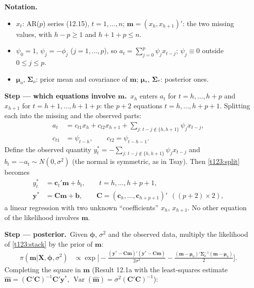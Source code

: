 \documentclass[11pt,a4paper]{article}
\newenvironment{notacao}{\par\smallskip\noindent\textbf{Notation.}\begin{itemize}[leftmargin=1.4em,topsep=1pt,itemsep=0pt]\small}{\end{itemize}}
\newcommand{\passo}[2]{\par\smallskip\noindent\textbf{Step --- #1.}~#2}
\begin{document}
\begin{sol}
\begin{notacao}
\item $x_t$: AR($p$) series (12.15), $t=1,\ldots,n$; $\boldsymbol m=(x_h,x_{h+1})'$: the two missing values, with $h-p\ge1$ and $h+1+p\le n$.
\item $\psi_0=1$, $\psi_j=-\phi_j$ ($j=1,\ldots,p$), so $a_t=\sum_{j=0}^p\psi_jx_{t-j}$; $\psi_j\equiv0$ outside $0\le j\le p$.
\item $\boldsymbol\mu_o$, $\boldsymbol\Sigma_o$: prior mean and covariance of $\boldsymbol m$; $\boldsymbol\mu_*$, $\boldsymbol\Sigma_*$: posterior ones.
\end{notacao}
\passo{which equations involve $\boldsymbol m$}{$x_h$ enters $a_t$ for $t=h,\ldots,h+p$ and $x_{h+1}$ for $t=h+1,\ldots,h+1+p$: the $p+2$ equations $t=h,\ldots,h+p+1$. Splitting each into the missing and the observed parts:
\begin{align}
a_t&=c_{t1}x_h+c_{t2}x_{h+1}+\textstyle\sum_{j:\,t-j\notin\{h,h+1\}}\psi_jx_{t-j},\label{t123:split}\\
c_{t1}&=\psi_{t-h},\qquad c_{t2}=\psi_{t-h-1}.\label{t123:c}
\end{align}
Define the observed quantity $y_t^*=-\sum_{j:\,t-j\notin\{h,h+1\}}\psi_jx_{t-j}$ and $b_t=-a_t\sim N(0,\sigma^2)$ (the normal is symmetric, as in Tsay). Then \eqref{t123:split} becomes
\begin{align}
y_t^*&=\boldsymbol c_t'\boldsymbol m+b_t,\qquad t=h,\ldots,h+p+1,\label{t123:reg}\\
\boldsymbol y^*&=\boldsymbol C\boldsymbol m+\boldsymbol b,\qquad\boldsymbol C=(\boldsymbol c_h,\ldots,\boldsymbol c_{h+p+1})'\ \ ((p+2)\times2),\label{t123:stack}
\end{align}
a linear regression with two unknown ``coefficients'' $x_h$, $x_{h+1}$. No other equation of the likelihood involves $\boldsymbol m$.}
\passo{posterior}{Given $\boldsymbol\phi$, $\sigma^2$ and the observed data, multiply the likelihood of \eqref{t123:stack} by the prior of $\boldsymbol m$:
\begin{align}
\pi(\boldsymbol m|\boldsymbol X,\boldsymbol\phi,\sigma^2)&\propto\exp\Big[-\frac{(\boldsymbol y^*-\boldsymbol C\boldsymbol m)'(\boldsymbol y^*-\boldsymbol C\boldsymbol m)}{2\sigma^2}-\frac{(\boldsymbol m-\boldsymbol\mu_o)'\boldsymbol\Sigma_o^{-1}(\boldsymbol m-\boldsymbol\mu_o)}{2}\Big].\label{t123:post}
\end{align}
Completing the square in $\boldsymbol m$ (Result 12.1a with the least-squares estimate $\hat{\boldsymbol m}=(\boldsymbol C'\boldsymbol C)^{-1}\boldsymbol C'\boldsymbol y^*$, $\operatorname{Var}(\hat{\boldsymbol m})=\sigma^2(\boldsymbol C'\boldsymbol C)^{-1}$):
}
\end{sol}
\end{document}
